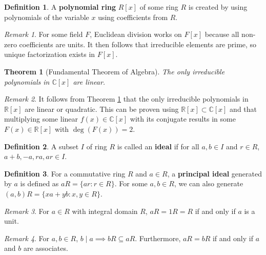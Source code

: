 \documentclass[11pt]{article}
\newtheorem{theorem}{Theorem}[definition]
\theoremstyle{definition}
\newtheorem{definition}{Definition}[section]
\theoremstyle{remark}
\newtheorem{remark}{Remark}[definition]
\begin{document}
\begin{definition}
    A \textbf{polynomial ring} $R[x]$ of some ring $R$ is created by using
    polynomials of the variable $x$ using coefficients from $R$.
\end{definition}

\begin{remark}
    For some field $F$, Euclidean division works on $F[x]$ because all non-zero
    coefficients are units.
    It then follows that irreducible elements are prime, so unique factorization
    exists in $F[x]$.
\end{remark}

\begin{theorem}[Fundamental Theorem of Algebra]
    \label{thm:fundamental theorem of algebra}
    The only irreducible polynomials in $\mathbb{C}[x]$ are linear.
\end{theorem}

\begin{remark}
    It follows from Theorem \ref{thm:fundamental theorem of algebra} that the
    only irreducible polynomials in $\mathbb{R}[x]$ are linear or quadratic.
    This can be proven using $\mathbb{R}[x]\subset\mathbb{C}[x]$ and that
    multiplying some linear $f(x)\in\mathbb{C}[x]$ with its conjugate results
    in some $F(x)\in\mathbb{R}[x]$ with $\deg(F(x))=2$.
\end{remark}

\begin{definition}
    A subset $I$ of ring $R$ is called an \textbf{ideal} if for all
    $a,b\in I$ and $r\in R$, $a+b,-a,ra,ar\in I$.
\end{definition}

\begin{definition}
    For a commutative ring $R$ and $a\in R$, a \textbf{principal ideal}
    generated by $a$ is defined as $aR=\{ar:r\in R\}$.
    For some $a,b\in R$, we can also generate $(a,b)R=\{xa+yb:x,y\in R\}$.
\end{definition}

\begin{remark}
    For $a\in R$ with integral domain $R$, $aR=1R=R$ if and only if $a$ is a
    unit.
\end{remark}

\begin{remark}
    For $a,b\in R$, $b\mid a\implies bR\subseteq aR$.
    Furthermore, $aR=bR$ if and only if $a$ and $b$ are associates.
\end{remark}
\end{document}
